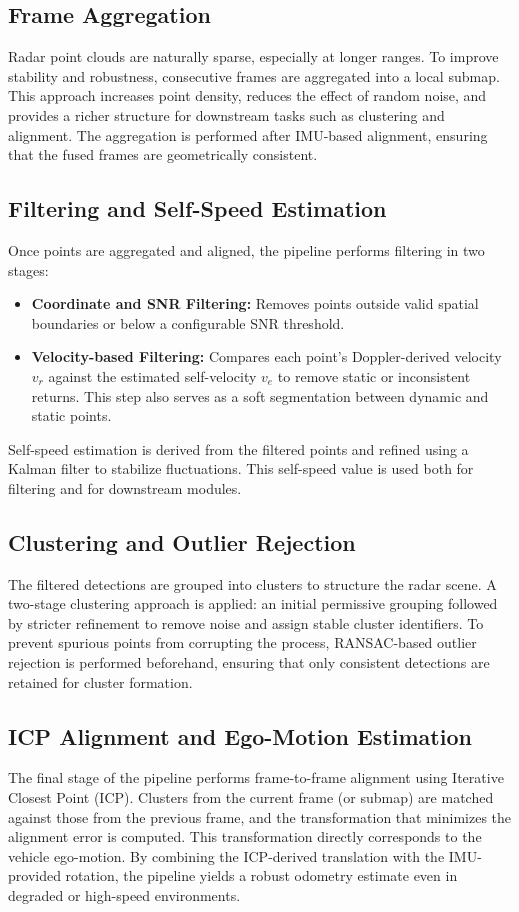 \subsection*{Frame Aggregation}
Radar point clouds are naturally sparse, especially at longer ranges. 
To improve stability and robustness, consecutive frames are aggregated into a local submap. 
This approach increases point density, reduces the effect of random noise, and provides a richer structure for downstream tasks such as clustering and alignment. 
The aggregation is performed after IMU-based alignment, ensuring that the fused frames are geometrically consistent. 

\subsection*{Filtering and Self-Speed Estimation}
Once points are aggregated and aligned, the pipeline performs filtering in two stages:

\begin{itemize}
    \item \textbf{Coordinate and SNR Filtering:} Removes points outside valid spatial boundaries or below a configurable SNR threshold.
    \item \textbf{Velocity-based Filtering:} Compares each point's Doppler-derived velocity $v_r$ against the estimated self-velocity $v_e$ to remove static or inconsistent returns. This step also serves as a soft segmentation between dynamic and static points.
\end{itemize}

Self-speed estimation is derived from the filtered points and refined using a Kalman filter to stabilize fluctuations. This self-speed value is used both for filtering and for downstream modules.

\subsection*{Clustering and Outlier Rejection}
The filtered detections are grouped into clusters to structure the radar scene. 
A two-stage clustering approach is applied: an initial permissive grouping followed by stricter refinement to remove noise and assign stable cluster identifiers.  
To prevent spurious points from corrupting the process, RANSAC-based outlier rejection is performed beforehand, ensuring that only consistent detections are retained for cluster formation.

\subsection*{ICP Alignment and Ego-Motion Estimation}
The final stage of the pipeline performs frame-to-frame alignment using Iterative Closest Point (ICP).  
Clusters from the current frame (or submap) are matched against those from the previous frame, and the transformation that minimizes the alignment error is computed.  
This transformation directly corresponds to the vehicle ego-motion.  
By combining the ICP-derived translation with the IMU-provided rotation, the pipeline yields a robust odometry estimate even in degraded or high-speed environments.

